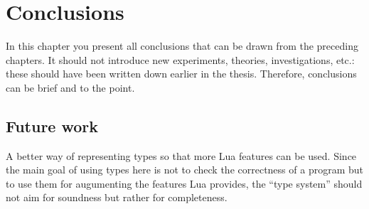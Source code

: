 \chapter{Conclusions}\label{conclusions}
In this chapter you present all conclusions that can be drawn from the
preceding chapters.
It should not introduce new experiments, theories, investigations, etc.:
these should have been written down earlier in the thesis.
Therefore, conclusions can be brief and to the point.

\section{Future work}
A better way of representing types so that more Lua features can be used. Since the main goal of using types here is not to check the correctness of a program but to use them for augumenting the features Lua provides, the ``type system'' should not aim for soundness but rather for completeness.
